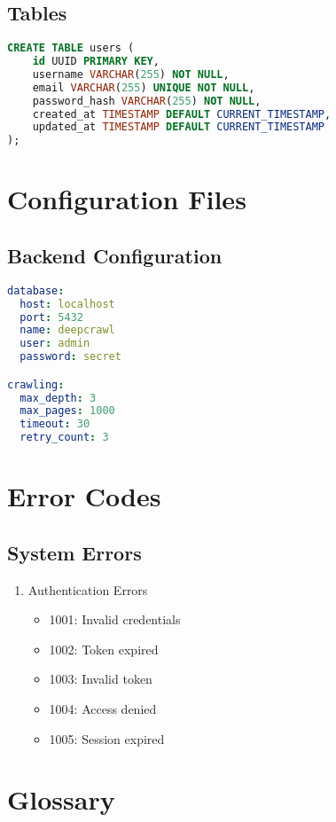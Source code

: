 \documentclass[12pt,a4paper]{report}
\begin{document}
\section{Tables}
\begin{lstlisting}[language=SQL]
CREATE TABLE users (
    id UUID PRIMARY KEY,
    username VARCHAR(255) NOT NULL,
    email VARCHAR(255) UNIQUE NOT NULL,
    password_hash VARCHAR(255) NOT NULL,
    created_at TIMESTAMP DEFAULT CURRENT_TIMESTAMP,
    updated_at TIMESTAMP DEFAULT CURRENT_TIMESTAMP
);
\end{lstlisting}

\chapter{Configuration Files}
\section{Backend Configuration}
\begin{lstlisting}[language=YAML]
database:
  host: localhost
  port: 5432
  name: deepcrawl
  user: admin
  password: secret

crawling:
  max_depth: 3
  max_pages: 1000
  timeout: 30
  retry_count: 3
\end{lstlisting}

\chapter{Error Codes}
\section{System Errors}
\begin{enumerate}
    \item Authentication Errors
    \begin{itemize}
        \item 1001: Invalid credentials
        \item 1002: Token expired
        \item 1003: Invalid token
        \item 1004: Access denied
        \item 1005: Session expired
    \end{itemize}
\end{enumerate}

\chapter{Glossary}
\end{document}
